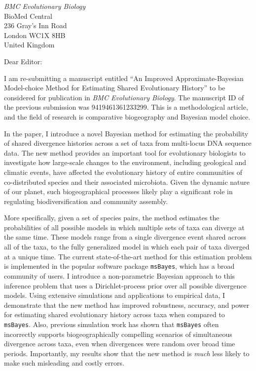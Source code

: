 \documentclass[letterpaper,11pt]{letter}
\begin{document}
\begin{letter}{\emph{BMC Evolutionary Biology} \\
                        BioMed Central \\
                        236 Gray's Inn Road \\
                        London WC1X 8HB \\
                        United Kingdom}
\opening{Dear Editor:}
I am re-submitting a manuscript entitled ``An Improved Approximate-Bayesian
Model-choice Method for Estimating Shared Evolutionary History'' to be
considered for publication in \emph{BMC Evolutionary Biology}.
The manuscript ID of the previous submission was 9419461361233299.
This is a methodological article, and the field of research is comparative
biogeography and Bayesian model choice.

In the paper, I introduce a novel Bayesian method for estimating the
probability of shared divergence histories across a set of taxa from
multi-locus DNA sequence data.
The new method provides an important tool for evolutionary biologists to
investigate how large-scale changes to the environment, including geological
and climatic events, have affected the evolutionary history of entire
communities of co-distributed species and their associated microbiota.
Given the dynamic nature of our planet, such biogeographical processes likely
play a significant role in regulating biodiversification and community assembly.

More specifically, given a set of species pairs, the method estimates
the probabilities of all possible models in which multiple sets of taxa
can diverge at the same time.
These models range from a single divergence event shared across all of the
taxa, to the fully generalized model in which each pair of taxa diverged at a
unique time.
The current state-of-the-art method for this estimation problem is implemented
in the popular software package \texttt{msBayes}, which has a broad community
of users.
I introduce a non-parametric Bayesian approach to this inference problem that
uses a Dirichlet-process prior over all possible divergence models.
Using extensive simulations and applications to empirical data, I demonstrate
that the new method has improved robustness, accuracy, and power for estimating
shared evolutionary history across taxa when compared to \texttt{msBayes}.
Also, previous simulation work has shown that \texttt{msBayes} often
incorrectly supports biogeographically compelling scenarios of simultaneous
divergence across taxa, even when divergences were random over broad time
periods.
Importantly, my results show that the new method is \emph{much} less likely to
make such misleading and costly errors.


\end{letter}
\end{document}
